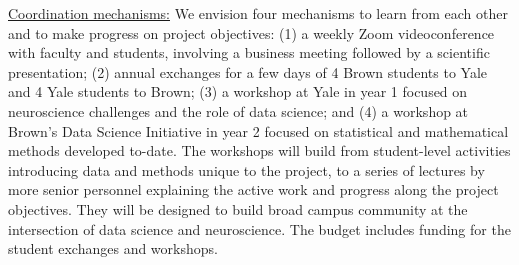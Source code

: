 \vskip4pt \noindent \underline{Coordination mechanisms:} 
We envision four mechanisms to learn from
each other and to make progress on project objectives: (1) a weekly
Zoom videoconference with faculty and students, involving a business
meeting followed by a scientific presentation; (2) annual exchanges
for a few days of 4 Brown students to Yale and 4 Yale students to
Brown; (3) a workshop at Yale in year 1 focused on neuroscience challenges and the role of data science; and (4) a workshop at Brown's Data Science Initiative in year 2 focused on statistical and mathematical methods developed to-date. The workshops will build from student-level activities introducing data and
methods unique to the project, to a series of lectures by more senior personnel explaining the active work and progress along the project objectives. They will be designed to build broad campus community at the intersection of data science and neuroscience. The budget includes funding for the student exchanges and workshops.



